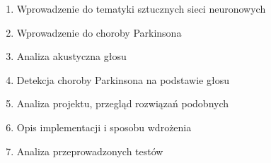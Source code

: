 \begin{enumerate}
 \item Wprowadzenie do tematyki sztucznych sieci neuronowych
 \item Wprowadzenie do choroby Parkinsona
 \item Analiza akustyczna głosu
 \item Detekcja choroby Parkinsona na podstawie głosu
 \item Analiza projektu, przegląd rozwiązań podobnych
 \item Opis implementacji i sposobu wdrożenia
 \item Analiza przeprowadzonych testów
\end{enumerate}

